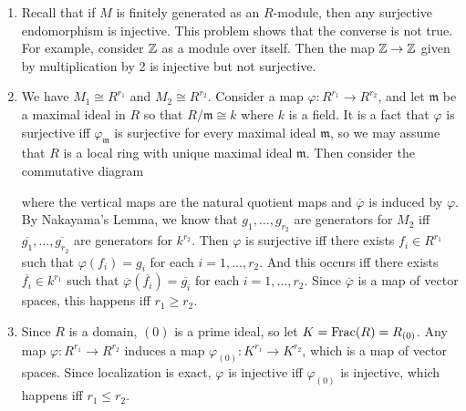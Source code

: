 \begin{solution}
\begin{enumerate}
    \item Recall that if $M$ is finitely generated as an $R$-module, then any surjective endomorphism is injective. This problem shows that the converse is not true. For example, consider $\mathbb{Z}$ as a module over itself. Then the map $\mathbb{Z} \to \mathbb{Z}$ given by multiplication by 2 is injective but not surjective.
    \item We have $M_1 \cong R^{r_1}$ and $M_2 \cong R^{r_2}$. Consider a map $\varphi: R^{r_1} \to R^{r_2}$, and let $\mathfrak{m}$ be a maximal ideal in $R$ so that $R/\mathfrak{m} \cong k$ where $k$ is a field. It is a fact that $\varphi$ is surjective iff $\varphi_{\mathfrak{m}}$ is surjective for every maximal ideal $\mathfrak{m}$, so we may assume that $R$ is a local ring with unique maximal ideal $\mathfrak{m}$. Then consider the commutative diagram
    \begin{center}
    \end{center}
    where the vertical maps are the natural quotient maps and $\overline{\varphi}$ is induced by $\varphi$. By Nakayama's Lemma, we know that $g_1,\dots,g_{r_2}$ are generators for $M_2$ iff $\overline{g_1},\dots,\overline{g_{r_2}}$ are generators for $k^{r_2}$. Then $\varphi$ is surjective iff there exists $f_i \in R^{r_1}$ such that $\varphi(f_i) = g_i$ for each $i=1,\dots,r_2$. And this occurs iff there exists $\overline{f_i} \in k^{r_1}$ such that $\overline{\varphi}(\overline{f_i}) = \overline{g_i}$ for each $i=1,\dots,r_2$. Since $\overline{\varphi}$ is a map of vector spaces, this happens iff $r_1 \geq r_2$.
    \item Since $R$ is a domain, $(0)$ is a prime ideal, so let $K = \operatorname{Frac}(R) = R_{(0)}$. Any map $\varphi: R^{r_1} \to R^{r_2}$ induces a map $\varphi_{(0)}: K^{r_1} \to K^{r_2}$, which is a map of vector spaces. Since localization is exact, $\varphi$ is injective iff $\varphi_{(0)}$ is injective, which happens iff $r_1 \leq r_2$.
\end{enumerate}
\end{solution}

